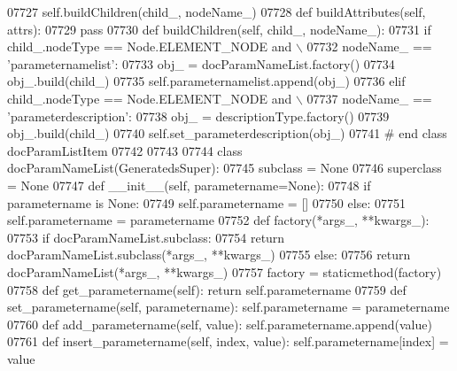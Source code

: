 \begin{DoxyCode}
{{{{{{{{{{{{{{{{{{{{{{{{{{{{{{{{{{{{{{{{{{{{{{{{{{{{{{{{{{{{{{{{{{{{{{{{{{{{{{{{{{{{{{{{{{{{{{{{{{{{{{{{{{{{{{{{{{{{{{{{{{{{{{{{{{{{{{{{{{{{{{{{{{{{{{{{{{{{{{{{{{{{{{{{{{{{{{{{{{{{{{{{{{{{{{{{{{{{{{{{{{{{{{{{{{{{{{{{{{{{{{{{{{{{{{{{{{{{{{{{{{{{{{{{{{{{{{{{{{{{{{{{{{{{{{{{{{{{{{{{{{{{{{{{{{{{{{{{{{{{{{{{{{{{{{{{{{{{{{{{{{{{{{{{{{{{{{{{{{{{{{{{{{{{{{{{{{{{{{{{{{{{{{{{{{{{{{{{{{{{{{{{{{{{{{{{{{{{{{{{{{{{{{{{{{{{{{{{{{{{{{{{{{{{{{{{{{{{{{{{{{{{{{{{{{{{{{{{{{{{{{{{{{{{{{{{{{{{{{{{07727             self.buildChildren(child\_, nodeName\_)
07728     \textcolor{keyword}{def }buildAttributes(self, attrs):
07729         \textcolor{keywordflow}{pass}
07730     \textcolor{keyword}{def }buildChildren(self, child\_, nodeName\_):
07731         \textcolor{keywordflow}{if} child\_.nodeType == Node.ELEMENT\_NODE \textcolor{keywordflow}{and} \(\backslash\)
07732             nodeName\_ == \textcolor{stringliteral}{'parameternamelist'}:
07733             obj\_ = docParamNameList.factory()
07734             obj\_.build(child\_)
07735             self.parameternamelist.append(obj\_)
07736         \textcolor{keywordflow}{elif} child\_.nodeType == Node.ELEMENT\_NODE \textcolor{keywordflow}{and} \(\backslash\)
07737             nodeName\_ == \textcolor{stringliteral}{'parameterdescription'}:
07738             obj\_ = descriptionType.factory()
07739             obj\_.build(child\_)
07740             self.set\_parameterdescription(obj\_)
07741 \textcolor{comment}{# end class docParamListItem}
07742 
07743 
07744 \textcolor{keyword}{class }docParamNameList(GeneratedsSuper):
07745     subclass = \textcolor{keywordtype}{None}
07746     superclass = \textcolor{keywordtype}{None}
07747     \textcolor{keyword}{def }__init__(self, parametername=None):
07748         \textcolor{keywordflow}{if} parametername \textcolor{keywordflow}{is} \textcolor{keywordtype}{None}:
07749             self.parametername = []
07750         \textcolor{keywordflow}{else}:
07751             self.parametername = parametername
07752     \textcolor{keyword}{def }factory(*args\_, **kwargs\_):
07753         \textcolor{keywordflow}{if} docParamNameList.subclass:
07754             \textcolor{keywordflow}{return} docParamNameList.subclass(*args\_, **kwargs\_)
07755         \textcolor{keywordflow}{else}:
07756             \textcolor{keywordflow}{return} docParamNameList(*args\_, **kwargs\_)
07757     factory = staticmethod(factory)
07758     \textcolor{keyword}{def }get_parametername(self): \textcolor{keywordflow}{return} self.parametername
07759     \textcolor{keyword}{def }set_parametername(self, parametername): self.parametername = parametername
07760     \textcolor{keyword}{def }add_parametername(self, value): self.parametername.append(value)
07761     \textcolor{keyword}{def }insert_parametername(self, index, value): self.parametername[index] = value
}}}}}}}}}}}}}}}}}}}}}}}}}}}}}}}}}}}}}}}}}}}}}}}}}}}}}}}}}}}}}}}}}}}}}}}}}}}}}}}}}}}}}}}}}}}}}}}}}}}}}}}}}}}}}}}}}}}}}}}}}}}}}}}}}}}}}}}}}}}}}}}}}}}}}}}}}}}}}}}}}}}}}}}}}}}}}}}}}}}}}}}}}}}}}}}}}}}}}}}}}}}}}}}}}}}}}}}}}}}}}}}}}}}}}}}}}}}}}}}}}}}}}}}}}}}}}}}}}}}}}}}}}}}}}}}}}}}}}}}}}}}}}}}}}}}}}}}}}}}}}}}}}}}}}}}}}}}}}}}}}}}}}}}}}}}}}}}}}}}}}}}}}}}}}}}}}}}}}}}}}}}}}}}}}}}}}}}}}}}}}}}}}}}}}}}}}}}}}}}}}}}}}}}}}}}}}}}}}}}}}}}}}}}}}}}}}}}}}}}}}}}}}}}}}}}}}}}}}}}}}}}}}}}}}}}}}}}}}}}}
\end{DoxyCode}
